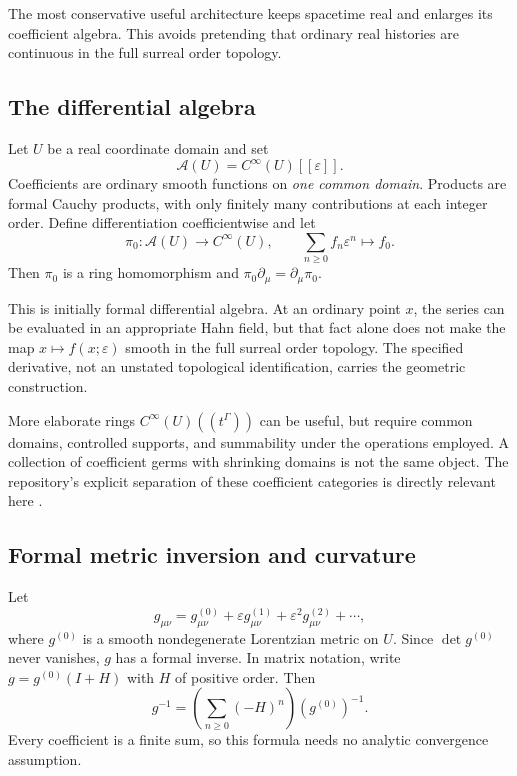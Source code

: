 \documentclass[11pt,letterpaper]{article}
\newcommand{\eps}{\varepsilon}
\theoremstyle{definition}
\theoremstyle{remark}
\begin{document}
The most conservative useful architecture keeps spacetime real and enlarges
its coefficient algebra. This avoids pretending that ordinary real histories
are continuous in the full surreal order topology.

\subsection{The differential algebra}

Let $U$ be a real coordinate domain and set
\[
 \mathcal A(U)=C^\infty(U)[[\eps]].
\]
Coefficients are ordinary smooth functions on \emph{one common domain}. Products
are formal Cauchy products, with only finitely many contributions at each
integer order. Define differentiation coefficientwise and let
\[
 \pi_0:\mathcal A(U)\longrightarrow C^\infty(U),
 \qquad \sum_{n\geq0}f_n\eps^n\longmapsto f_0.
\]
Then $\pi_0$ is a ring homomorphism and
$\pi_0\partial_\mu=\partial_\mu\pi_0$.

This is initially formal differential algebra. At an ordinary point $x$, the
series can be evaluated in an appropriate Hahn field, but that fact alone does
not make the map $x\mapsto f(x;\eps)$ smooth in the full surreal order topology.
The specified derivative, not an unstated topological identification, carries
the geometric construction.

More elaborate rings $C^\infty(U)((t^\Gamma))$ can be useful, but require common
domains, controlled supports, and summability under the operations employed.
A collection of coefficient germs with shrinking domains is not the same
object. The repository's explicit separation of these coefficient categories
is directly relevant here \cite{RepoDocs}.

\subsection{Formal metric inversion and curvature}

Let
\begin{equation}
 g_{\mu\nu}=g^{(0)}_{\mu\nu}
       +\eps g^{(1)}_{\mu\nu}+\eps^2g^{(2)}_{\mu\nu}+\cdots,
 \label{eq:formalg}
\end{equation}
where $g^{(0)}$ is a smooth nondegenerate Lorentzian metric on $U$. Since
$\det g^{(0)}$ never vanishes, $g$ has a formal inverse. In matrix notation,
write $g=g^{(0)}(I+H)$ with $H$ of positive order. Then
\begin{equation}
 g^{-1}=\left(\sum_{n\geq0}(-H)^n\right)(g^{(0)})^{-1}.
 \label{eq:ginv}
\end{equation}
Every coefficient is a finite sum, so this formula needs no analytic
convergence assumption.
\end{document}
